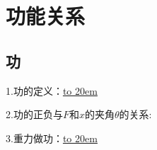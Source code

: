 \documentclass[a4paper,12pt]{article}
\newcommand{\lsn}[1]{\noindent\textsc{\color{orange} #1.}}
\newcommand{\lunl}[1]{\underline{\hbox to #1{}}}%
\begin{document}

\section{功能关系}
\subsection{功}

\lsn{1}功的定义：\lunl{20em}

\lsn{2}功的正负与\(F\)和\(x\)的夹角\(\theta\)的关系:
\vspace*{2cm}

\lsn{3}重力做功：\lunl{20em}
\end{document}
